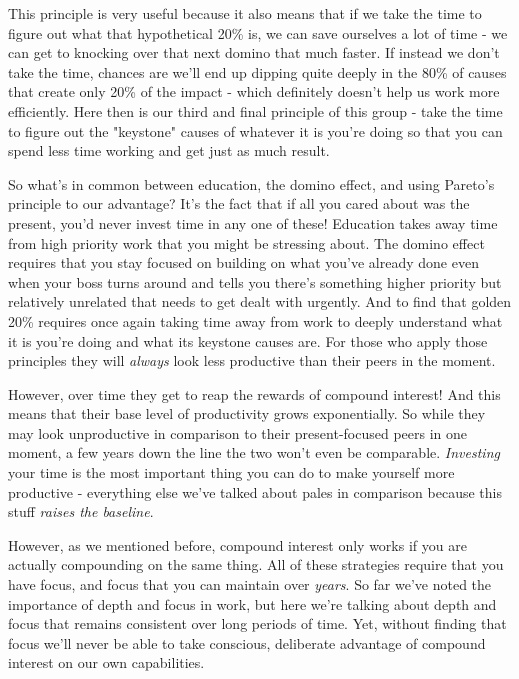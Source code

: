 \documentclass[11pt]{book}
\begin{document}
This principle is very useful because it also means that if we take the time to figure out what that hypothetical 20\% is, we can save ourselves a lot of time - we can get to knocking over that next domino that much faster. If instead we don't take the time, chances are we'll end up dipping quite deeply in the 80\% of causes that create only 20\% of the impact - which definitely doesn't help us work more efficiently. Here then is our third and final principle of this group - take the time to figure out the "keystone" causes of whatever it is you're doing so that you can spend less time working and get just as much result.
\newline

So what's in common between education, the domino effect, and using Pareto's principle to our advantage? It's the fact that if all you cared about was the present, you'd never invest time in any one of these! Education takes away time from high priority work that you might be stressing about. The domino effect requires that you stay focused on building on what you've already done even when your boss turns around and tells you there's something higher priority but relatively unrelated that needs to get dealt with urgently. And to find that golden 20\% requires once again taking time away from work to deeply understand what it is you're doing and what its keystone causes are. For those who apply those principles they will \textit{always} look less productive than their peers in the moment. 
\newline

However, over time they get to reap the rewards of compound interest! And this means that their base level of productivity grows exponentially. So while they may look unproductive in comparison to their present-focused peers in one moment, a few years down the line the two won't even be comparable. \textit{Investing} your time is the most important thing you can do to make yourself more productive - everything else we've talked about pales in comparison because this stuff \textit{raises the baseline}. 
\newline

However, as we mentioned before, compound interest only works if you are actually compounding on the same thing. All of these strategies require that you have focus, and focus that you can maintain over \textit{years}. So far we've noted the importance of depth and focus in work, but here we're talking about depth and focus that remains consistent over long periods of time. Yet, without finding that focus we'll never be able to take conscious, deliberate advantage of compound interest on our own capabilities.
\end{document}
